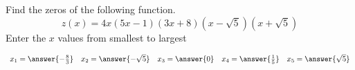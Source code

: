 \documentclass{ximera}
\author{David Kish}
\begin{document}
\begin{exercise}
Find the zeros of the following function.
\[
z(x)=4x(5x-1)(3x+8)(x-\sqrt{5})(x+\sqrt{5})
\]
Enter the $x$ values from smallest to largest
\begin{center}
$
\begin{array}{ccccc}
x_1 = \answer{-\frac{8}{3}} & x_2  = \answer{-\sqrt{5}} & x_3 = \answer{0} & x_4  = \answer{\frac{1}{5}} & x_5 = \answer{\sqrt{5}}
\end{array}
$
\end{center}
\end{exercise}
\end{document}
